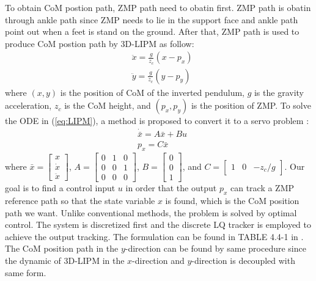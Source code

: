 \documentclass{ieeeaccess}
\begin{document}
To obtain CoM postion path, ZMP path need to obatin first. ZMP path is obatin through ankle path since ZMP needs to lie in the support face and ankle path point out when a feet is stand on the ground. After that, ZMP path is used to produce CoM postion path by 3D-LIPM as follow:
\begin{equation} \label{eq:LIPM}
    \begin{split}
        & \ddot{x} = \frac{g}{z_c}(x - p_x) \\
        & \ddot{y} = \frac{g}{z_c}(y - p_y)
    \end{split}
\end{equation}
where $(x,y)$ is the position of CoM of the inverted pendulum, $g$ is the gravity acceleration, $z_c$ is the CoM height, and $(p_x,p_y)$ is the position of ZMP. To solve the ODE in (\ref{eq:LIPM}), a method is proposed to convert it to a servo problem \cite{1241826}:
\begin{equation} \label{eq:output tracking}
    \begin{split}
        & \dot{\bar{x}} = A\bar{x} + Bu \\
        & p_x = C\bar{x}
    \end{split}
\end{equation}
where $\bar{x} = \begin{bmatrix}
    x \\ \dot{x} \\ \ddot{x}
\end{bmatrix}$, $A = \begin{bmatrix}
    0 & 1 & 0 \\ 0 & 0 & 1 \\ 0 & 0 & 0
\end{bmatrix}$, $B = \begin{bmatrix}
    0 \\ 0 \\ 1
\end{bmatrix}$, and $C = \begin{bmatrix}
    1 & 0 & -z_c/g
\end{bmatrix}$. Our goal is to find a control input $u$ in order that the output $p_x$ can track a ZMP reference path so that the state variable $x$ is found, which is the CoM position path we want. Unlike conventional methods, the problem is solved by optimal control. The system is discretized first and the discrete LQ tracker is employed to achieve the output tracking. The formulation can be found in TABLE 4.4-1 in \cite{lewis2012optimal}. The CoM position path in the $y$-direction can be found by same procedure since the dynamic of 3D-LIPM in the $x$-direction and $y$-direction is decoupled with same form. 
\end{document}
